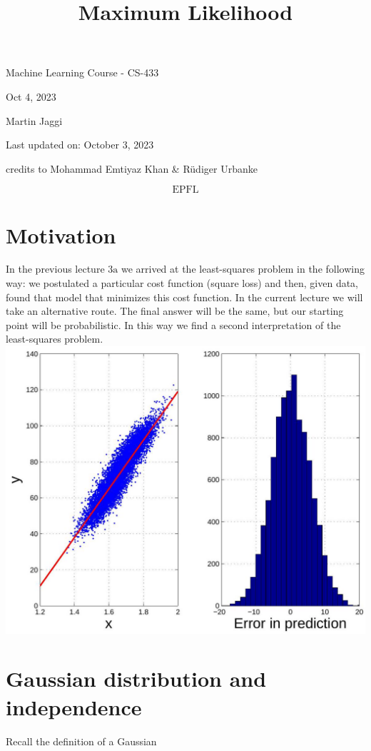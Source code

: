 \documentclass[10pt]{article}
\title{Maximum Likelihood }
\author{}
\date{}
\begin{document}
\maketitle
Machine Learning Course - CS-433

Oct 4, 2023

Martin Jaggi

Last updated on: October 3, 2023

credits to Mohammad Emtiyaz Khan \& Rüdiger Urbanke

$$
\text { EPFL }
$$

\section*{Motivation}
In the previous lecture $3 \mathrm{a}$ we arrived at the least-squares problem in the following way: we postulated a particular cost function (square loss) and then, given data, found that model that minimizes this cost function. In the current lecture we will take an alternative route. The final answer will be the same, but our starting point will be probabilistic. In this way we find a second interpretation of the least-squares problem.
\includegraphics[max width=\textwidth, center]{2023_12_30_b8ee6e6de203e1077c28g-2}

\section*{Gaussian distribution and independence}
Recall the definition of a Gaussian
\end{document}
